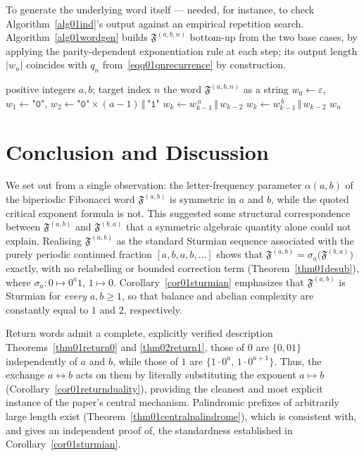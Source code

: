 \documentclass[12pt]{amsart}
\theoremstyle{plain}
\theoremstyle{definition}
\theoremstyle{remark}
\newcommand{\FD}{\mathfrak{F}}
\begin{document}
To generate the underlying word itself — needed, for instance, to check
Algorithm~\ref{alg01ind}'s output against an empirical repetition search. Algorithm~\ref{alg01wordgen}
builds $\FD^{(a,b,n)}$ bottom-up from the two base cases, by applying the
parity-dependent exponentiation rule at each step; its output length
$|w_n|$ coincides with $q_n$ from~\eqref{eqq01qnrecurrence} by
construction.
\begin{algorithm}[H]
\small
\caption{Generate the finite biperiodic Fibonacci word $\FD^{(a,b,n)}$}
\label{alg01wordgen}
\begin{algorithmic}[1]
\Require positive integers $a,b$; target index $n$
\Ensure the word $\FD^{(a,b,n)}$ as a string
\State $w_0 \gets \varepsilon$,\quad $w_1 \gets \texttt{"0"}$,\quad
$w_2 \gets \texttt{"0"}\times(a-1) \,\Vert\, \texttt{"1"}$
    \State $w_k \gets w_{k-1}^{\,a} \,\Vert\, w_{k-2}$
  \Else
    \State $w_k \gets w_{k-1}^{\,b} \,\Vert\, w_{k-2}$
  \EndIf
\EndFor
\State \Return $w_n$
\end{algorithmic}
\end{algorithm}
\section{Conclusion and Discussion}

We set out from a single observation: the letter-frequency parameter
$\alpha(a,b)$ of the biperiodic Fibonacci word $\FD^{(a,b)}$ is symmetric
in $a$ and $b$, while the quoted critical exponent formula is not. This
suggested some structural correspondence between $\FD^{(a,b)}$ and
$\FD^{(b,a)}$ that a symmetric algebraic quantity alone could not explain. 
Realising $\FD^{(a,b)}$ as the standard Sturmian sequence associated with the
purely periodic continued fraction $[a,b,a,b,\ldots]$ shows that $\FD^{(a,b)} = \sigma_a\bigl(\FD^{(b,a)}\bigr)$
exactly, with no relabelling or bounded correction term
(Theorem~\ref{thm01desub}), where $\sigma_a\colon 0\mapsto 0^a1,\,1\mapsto 0$.
Corollary~\ref{cor01sturmian} emphasizes that $\FD^{(a,b)}$ is Sturmian for
\emph{every} $a,b\geqslant 1$, so that balance and abelian complexity are
constantly equal to $1$ and $2$, respectively. 

Return words admit a complete, explicitly verified description
Theorems~\ref{thm01return0} and \ref{thm02return1}, those of $0$ are
$\{0,01\}$ independently of $a$ and $b$, while those of $1$ are
$\{1\cdot0^a,\,1\cdot0^{a+1}\}$. Thus, the exchange $a\leftrightarrow b$ acts on
them by literally substituting the exponent $a\mapsto b$
(Corollary~\ref{cor01returnduality}), providing the cleanest and most
explicit instance of the paper's central mechanism. Palindromic prefixes of arbitrarily large length exist
(Theorem~\ref{thm01centralpalindrome}), which is consistent with, and gives
an independent proof of, the standardness established in
Corollary~\ref{cor01sturmian}.
\end{document}
